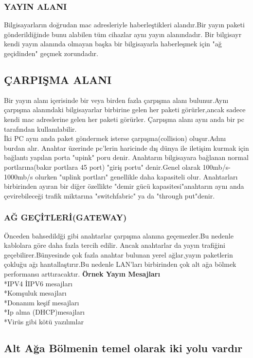 \subsubsection*{YAYIN ALANI}
Bilgisayarların doğrudan mac adresleriyle haberleştikleri alandır.Bir yayın paketi gönderildiğinde bunu alabilen tüm cihazlar aynı yayın alanındadır.
Bir bilgisayr kendi yayın alanında olmayan başka bir bilgisayarla haberleşmek için "ağ geçidinden" geçmek zorundadır.
\subsection*{ÇARPIŞMA ALANI}
Bir yayın alanı içerisinde bir veya birden fazla çarpışma alanı bulunur.Aynı çarpışma alanındaki bilgisayarlar birbirine gelen her paketi görürler,ancak sadece kendi mac adreslerine gelen her paketi görürler.
Çarpışma alanı aynı anda bir pc tarafından kullanılabilir.\\
İki PC aynı anda paket göndermek isterse çarpışma(collision) oluşur.Adını burdan alır.
Anahtar üzerinde pc'lerin haricinde dış dünya ile iletişim kurmak için bağlantı yapılan porta "upink" poru denir.
Anahtarın bilgisayara bağlanan normal portlarına(bakır portlara 45 port) "giriş portu" denir.Genel olarak 100mb/s-1000mb/s  olurken "uplink portları" genellikle daha kapasiteli olur.
Anahtarları birbirinden ayıran bir diğer özellikte "demir gücü kapasitesi"anahtarın aynı  anda çevirebileceği trafik miktarına "switchfabric" ya da "through put"denir.
\subsubsection*{AĞ GEÇİTLERİ(GATEWAY)}
Önceden bahsedildği gibi anahtarlar çarpışma alanına geçemezler.Bu nedenle kablolara göre daha fazla tercih edilir.
Ancak anahtarlar da yayın trafiğini geçebilirer.Bünyesinde çok fazla anahtar bulunan yerel ağlar,yayın paketlerin çokluğu ağı hantallaştırır.Bu nedenle LAN'ları birbirinden çok alt ağa bölmek performansı arttıracaktır.
\textbf{Örnek Yayın Mesajları}\\
*IPV4 İIPV6 mesajları\\
*Komşuluk mesajları\\
*Donanım keşif mesajları\\
*Ip alma (DHCP)mesajları\\
*Virüs gibi kötü yazılımlar\\
\subsection*{Alt Ağa Bölmenin temel olarak iki yolu vardır}

